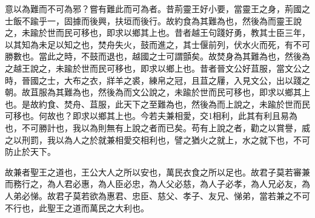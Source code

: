 \begin{pinyinscope}
意以為難而不可為邪？嘗有難此而可為者。昔荊靈王好小要，當靈王之身，荊國之士飯不踰乎一，固據而後興，扶垣而後行。故約食為其難為也，然後為而靈王說之，未踰於世而民可移也，即求以鄉其上也。昔者越王句踐好勇，教其士臣三年，以其知為未足以知之也，焚舟失火，鼓而進之，其士偃前列，伏水火而死，有不可勝數也。當此之時，不鼓而退也，越國之士可謂顫矣。故焚身為其難為也，然後為之越王說之，未踰於世而民可移也，即求以鄉上也。昔者晉文公好苴服，當文公之時，晉國之士，大布之衣，牂羊之裘，練帛之冠，且苴之屨，入見文公，出以踐之朝。故苴服為其難為也，然後為而文公說之，未踰於世而民可移也，即求以鄉其上也。是故約食、焚舟、苴服，此天下之至難為也，然後為而上說之，未踰於世而民可移也。何故也？即求以鄉其上也。今若夫兼相愛，交1相利，此其有利且易為也，不可勝計也，我以為則無有上說之者而已矣。苟有上說之者，勸之以賞譽，威之以刑罰，我以為人之於就兼相愛交相利也，譬之猶火之就上，水之就下也，不可防止於天下。

故兼者聖王之道也，王公大人之所以安也，萬民衣食之所以足也。故君子莫若審兼而務行之，為人君必惠，為人臣必忠，為人父必慈，為人子必孝，為人兄必友，為人弟必悌。故君子莫若欲為惠君、忠臣、慈父、孝子、友兄、悌弟，當若兼之不可不行也，此聖王之道而萬民之大利也。


\end{pinyinscope}
